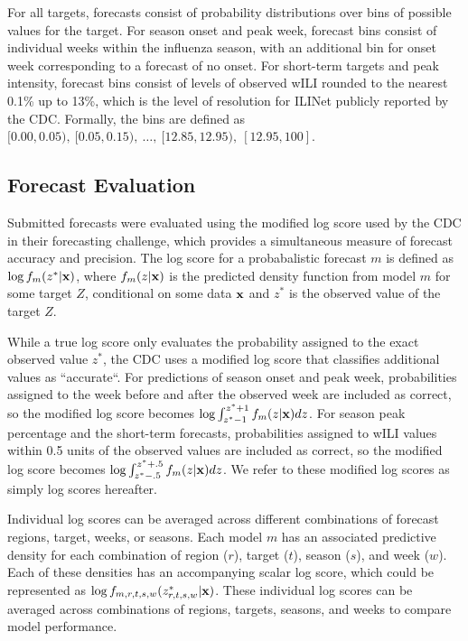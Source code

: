 \documentclass{article}\usepackage[]{graphicx}\usepackage[]{color}
\begin{document}
For all targets, forecasts consist of probability distributions over bins of possible values for the target. For season onset and peak week, forecast bins consist of individual weeks within the influenza season, with an additional bin for onset week corresponding to a forecast of no onset. For short-term targets and peak intensity, forecast bins consist of levels of observed wILI rounded to the nearest 0.1\% up to 13\%, which is the level of resolution for ILINet publicly reported by the CDC. Formally, the bins are defined as $[0.00, 0.05),\ [0.05, 0.15),\ \dots,\ [12.85, 12.95),\ [12.95, 100]$. 

\subsection{Forecast Evaluation}
Submitted forecasts were evaluated using the modified log score used by the CDC in their forecasting challenge, which provides a simultaneous measure of forecast accuracy and precision. The log score for a probabalistic forecast $m$ is defined as $\log f_m(z^*|\bf{x})$, where $f_m(z|\bf{x})$ is the predicted density function from model $m$ for some target $Z$, conditional on some data $\bf{x}$ and $z^*$ is the observed value of the target $Z$. 

While a true log score only evaluates the probability assigned to the exact observed value $z^*$, the CDC uses a modified log score that classifies additional values as ``accurate``. For predictions of season onset and peak week, probabilities assigned to the week before and after the observed week are included as correct, so the modified log score becomes $\log \int_{z^* -1}^{z^* + 1} f_m(z|{\bf{x}})dz$. For season peak percentage and the short-term forecasts, probabilities assigned to wILI values within 0.5 units of the observed values are included as correct, so the modified log score becomes $\log \int_{z^* -.5}^{z^* + .5} f_m(z|{\bf{x}})dz$. We refer to these modified log scores as simply log scores hereafter.

Individual log scores can be averaged across different combinations of forecast regions, target, weeks, or seasons. Each model $m$ has an associated predictive density for each combination of region ($r$), target ($t$), season ($s$), and week ($w$). Each of these densities has an accompanying scalar log score, which could be represented as $\log f_{m,r,t,s,w}(z^*_{r,t,s,w}|\bf{x})$. These individual log scores can be averaged across combinations of regions, targets, seasons, and weeks to compare model performance.
\end{document}
